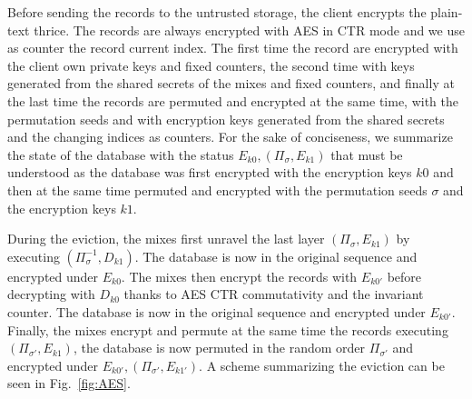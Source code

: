 \documentclass[USenglish,oneside,twocolumn]{article}
\begin{document}
Before sending the records to the untrusted storage, the client encrypts the plain-text thrice. The records are always encrypted with AES in CTR mode and we use as counter the record current index. The first time the record are encrypted with the client own private keys and fixed counters, the second time with keys generated from the shared secrets of the mixes and fixed counters, and finally at the last time the records are permuted and encrypted at the same time, with the permutation seeds and with encryption keys generated from the shared secrets and the changing indices as counters.
For the sake of conciseness, we summarize the state of the database with the status $E_{k0}, (\Pi_\sigma, E_{k1})$ that must be understood as the database was first encrypted with the encryption keys $k0$ and then at the same time permuted and encrypted with the permutation seeds $\sigma$ and the encryption keys $k1$.

During the eviction, the mixes first unravel the last layer $(\Pi_\sigma, E_{k1})$ by executing $(\Pi_{\sigma}^{-1}, D_{k1})$. The database is now in the original sequence and encrypted under $E_{k0}$. The mixes then encrypt the records with $E_{k0'}$ before decrypting with $D_{k0}$ thanks to AES CTR commutativity and the invariant counter. The database is now in the original sequence and encrypted under $E_{k0'}$. Finally, the mixes encrypt and permute at the same time the records executing $(\Pi_{\sigma'}, E_{k1})$, the database is now permuted in the random order $\Pi_{\sigma'}$ and encrypted under $E_{k0'}, (\Pi_{\sigma'}, E_{k1'})$. A scheme summarizing the eviction can be seen in Fig.~\ref{fig:AES}.  
\end{document}
